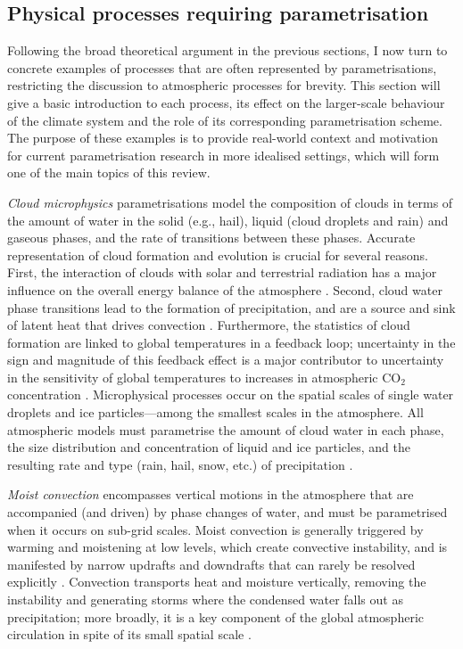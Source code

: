 \documentclass[titlepage,twoside]{article}
\numberwithin{equation}{section}
\begin{document}
\subsection{Physical processes requiring parametrisation}
Following the broad theoretical argument in the previous sections, I now turn to
concrete examples of processes that are often represented by parametrisations,
restricting the discussion to atmospheric processes for brevity. This section
will give a basic introduction to each process, its effect on the larger-scale
behaviour of the climate system and the role of its corresponding
parametrisation scheme. The purpose of these examples is to provide real-world
context and motivation for current parametrisation research in more idealised
settings, which will form one of the main topics of this review.

\emph{Cloud microphysics} parametrisations model the composition of clouds in
terms of the amount of water in the solid (e.g., hail), liquid (cloud droplets
and rain) and gaseous phases, and the rate of transitions between these phases.
Accurate representation of cloud formation and evolution is crucial for several
reasons. First, the interaction of clouds with solar and terrestrial radiation
has a major influence on the overall energy balance of the atmosphere
\parencite{mcfarlane2011}. Second, cloud water phase transitions lead to the
formation of precipitation, and are a source and sink of latent heat that
drives convection \parencite{mcfarlane2011}. Furthermore, the statistics of
cloud formation are linked to global temperatures in a feedback loop;
uncertainty in the sign and magnitude of this feedback effect is a major
contributor to uncertainty in the sensitivity of global temperatures to
increases in atmospheric CO$_2$ concentration \parencite{andrews2012,
christensen2022,stevens2013}. Microphysical processes occur on the spatial
scales of single water droplets and ice particles---among the smallest scales
in the atmosphere. All atmospheric models must parametrise the amount of cloud
water in each phase, the size distribution and concentration of liquid and ice
particles, and the resulting rate and type (rain, hail, snow, etc.) of
precipitation \parencite{christensen2022}.

\emph{Moist convection} encompasses vertical motions in the atmosphere that are
accompanied (and driven) by phase changes of water, and must be parametrised
when it occurs on sub-grid scales. Moist convection is generally triggered by
warming and moistening at low levels, which create convective instability, and
is manifested by narrow updrafts and downdrafts that can rarely be resolved
explicitly \parencite{mcfarlane2011}. Convection transports heat and moisture
vertically, removing the instability and generating storms where the condensed
water falls out as precipitation; more broadly, it is a key component of the
global atmospheric circulation in spite of its small spatial scale
\parencite{christensen2022}.
\end{document}
